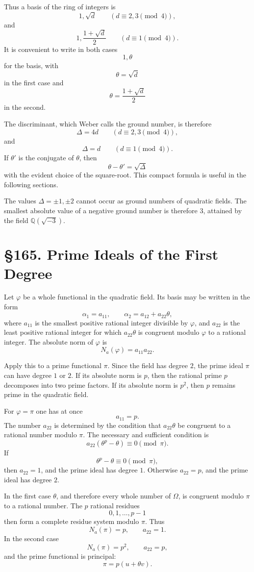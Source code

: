 \documentclass[11pt,a4paper]{book}
\newcommand{\webersection}[2]{\clearpage\section*{\S #1. #2}}
\begin{document}
Thus a basis of the ring of integers is
\[
  1,\sqrt d\qquad (d\equiv2,3\pmod4),
\tag{5a}
\]
and
\[
  1,\frac{1+\sqrt d}{2}\qquad (d\equiv1\pmod4).
\tag{5b}
\]
It is convenient to write in both cases
\[
  1,\theta
\]
for the basis, with
\[
  \theta=\sqrt d
\]
in the first case and
\[
  \theta=\frac{1+\sqrt d}{2}
\]
in the second.

The discriminant, which Weber calls the ground number, is therefore
\[
  \Delta=4d\qquad (d\equiv2,3\pmod4),
\tag{6a}
\]
and
\[
  \Delta=d\qquad (d\equiv1\pmod4).
\tag{6b}
\]
If \(\theta'\) is the conjugate of \(\theta\), then
\[
  \theta-\theta'=\sqrt\Delta
\tag{7}
\]
with the evident choice of the square-root.  This compact formula is useful in the following sections.

The values \(\Delta=\pm1,\pm2\) cannot occur as ground numbers of quadratic fields.  The smallest absolute value of a negative ground number is therefore \(3\), attained by the field \(\mathbb Q(\sqrt{-3})\).

\webersection{165}{Prime Ideals of the First Degree}

Let \(\varphi\) be a whole functional in the quadratic field.  Its basis may be written in the form
\[
  \alpha_1=a_{11},\qquad
  \alpha_2=a_{12}+a_{22}\theta,
\tag{1}
\]
where \(a_{11}\) is the smallest positive rational integer divisible by \(\varphi\), and \(a_{22}\) is the least positive rational integer for which \(a_{22}\theta\) is congruent modulo \(\varphi\) to a rational integer.  The absolute norm of \(\varphi\) is
\[
  N_a(\varphi)=a_{11}a_{22}.
\tag{2}
\]

Apply this to a prime functional \(\pi\).  Since the field has degree \(2\), the prime ideal \(\pi\) can have degree \(1\) or \(2\).  If its absolute norm is \(p\), then the rational prime \(p\) decomposes into two prime factors.  If its absolute norm is \(p^2\), then \(p\) remains prime in the quadratic field.

For \(\varphi=\pi\) one has at once
\[
  a_{11}=p.
\]
The number \(a_{22}\) is determined by the condition that \(a_{22}\theta\) be congruent to a rational number modulo \(\pi\).  The necessary and sufficient condition is
\[
  a_{22}(\theta^p-\theta)\equiv0\pmod{\pi}.
\tag{3}
\]
If
\[
  \theta^p-\theta\equiv0\pmod{\pi},
\]
then \(a_{22}=1\), and the prime ideal has degree \(1\).  Otherwise \(a_{22}=p\), and the prime ideal has degree \(2\).

In the first case \(\theta\), and therefore every whole number of \(\Omega\), is congruent modulo \(\pi\) to a rational number.  The \(p\) rational residues
\[
  0,1,\ldots,p-1
\]
then form a complete residue system modulo \(\pi\).  Thus
\[
  N_a(\pi)=p,\qquad a_{22}=1.
\tag{4a}
\]
In the second case
\[
  N_a(\pi)=p^2,\qquad a_{22}=p,
\tag{4b}
\]
and the prime functional is principal:
\[
  \pi=p(u+\theta v).
\tag{5}
\]
\end{document}
